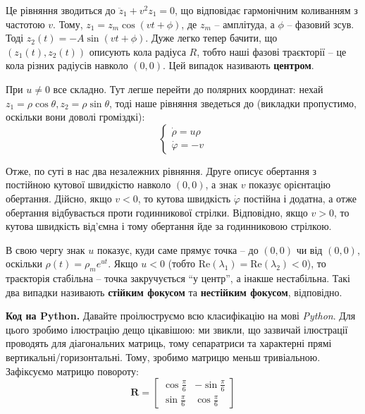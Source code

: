 \documentclass[oneside,solution]{tmpl}
\begin{document}
Це рівняння зводиться до $\ddot{z}_1 + v^2z_1 = 0$, що відповідає гармонічним коливанням з частотою $v$. Тому, $z_1 = z_m \cos (vt + \phi)$, де $z_m$ -- амплітуда, а $\phi$ -- фазовий зсув. Тоді $z_2(t) = -A \sin (vt + \phi)$. Дуже легко тепер бачити, що $(z_1(t), z_2(t))$ описують кола радіуса $R$, тобто наші фазові траєкторії -- це кола різних радіусів навколо $(0,0)$. Цей випадок називають \textbf{центром}.

При $u \neq 0$ все складно. Тут легше перейти до полярних координат: нехай $z_1=\rho \cos \theta, z_2=\rho \sin \theta$, тоді наше рівняння зведеться до (викладки пропустимо, оскільки вони доволі громіздкі):
\begin{equation}
    \begin{cases}
        \dot{\rho} = u\rho \\
        \dot{\varphi} = -v
    \end{cases}
\end{equation}

Отже, по суті в нас два незалежних рівняння. Друге описує обертання з постійною кутової швидкістю навколо $(0,0)$, а знак $v$ показує орієнтацію обертання. Дійсно, якщо $v<0$, то кутова швидкість $\dot{\varphi}$ постійна і додатна, а отже обертання відбувається проти годинникової стрілки. Відповідно, якщо $v>0$, то кутова швидкість від'ємна і тому обертання йде за годинниковою стрілкою.

В свою чергу знак $u$ показує, куди саме прямує точка -- до $(0,0)$ чи від $(0,0)$, оскільки $\rho(t) = \rho_m e^{ut}$. Якщо $u < 0$ (тобто $\text{Re}(\lambda_1) = \text{Re}(\lambda_2) < 0$), то траєкторія стабільна -- точка закручується ``у центр'', а інакше нестабільна. Такі два випадки називають \textbf{стійким фокусом} та \textbf{нестійким фокусом}, відповідно. 

\textbf{Код на Python.} Давайте проілюструємо всю класифікацію на мові \textit{Python}. Для цього зробимо ілюстрацію дещо цікавішою: ми звикли, що зазвичай ілюстрації проводять для діагональних матриць, тому сепаратриси та характерні прямі вертикальні/горизонтальні. Тому, зробимо матрицю меньш тривіальною. Зафіксуємо матрицю повороту:
\begin{equation}
    \boldsymbol{R} = \begin{bmatrix}
        \cos \frac{\pi}{6} & -\sin \frac{\pi}{6} \\
        \sin \frac{\pi}{6} & \cos \frac{\pi}{6}
    \end{bmatrix}
\end{equation}
\end{document}
